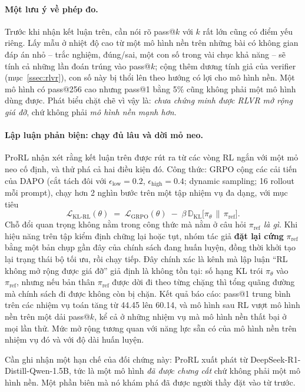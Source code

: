 \paragraph{Một lưu ý về phép đo.}
Trước khi nhận kết luận trên, cần nói rõ pass@$k$ với $k$ rất lớn cũng có điểm yếu riêng. Lấy mẫu ở nhiệt độ cao từ một mô hình nền trên những bài có không gian đáp án nhỏ -- trắc nghiệm, đúng/sai, một con số trong vài chục khả năng -- sẽ tính cả những lần đoán trúng vào pass@$k$; cộng thêm dương tính giả của verifier (mục~\ref{ssec:rlvr}), con số này bị thổi lên theo hướng có lợi cho mô hình nền. Một mô hình có pass@256 cao nhưng pass@1 bằng 5\% cũng không phải một mô hình dùng được. Phát biểu chặt chẽ vì vậy là: \emph{chưa chứng minh được RLVR mở rộng giá đỡ}, chứ không phải \emph{mô hình nền mạnh hơn}.

\paragraph{Lập luận phản biện: chạy đủ lâu và dời mỏ neo.}
ProRL \cite{liu2025prorl} nhận xét rằng kết luận trên được rút ra từ các vòng RL ngắn với một mỏ neo cố định, và thử phá cả hai điều kiện đó. Công thức: GRPO cộng các cải tiến của DAPO (cắt tách đôi với $\epsilon_{\mathrm{low}} = 0.2$, $\epsilon_{\mathrm{high}} = 0.4$; dynamic sampling; 16 rollout mỗi prompt), chạy hơn 2 nghìn bước trên một tập nhiệm vụ đa dạng, với mục tiêu
\[
\mathcal{L}_{\text{KL-RL}}(\theta) \;=\; \mathcal{L}_{\mathrm{GRPO}}(\theta) \;-\; \beta\,\mathbb{D}_{\mathrm{KL}}\big[\pi_\theta\,\big\|\,\pi_{\mathrm{ref}}\big].
\]
Chỗ đổi quan trọng không nằm trong công thức mà nằm ở câu hỏi \emph{$\pi_{\mathrm{ref}}$ là gì}. Khi hiệu năng trên tập kiểm định chững lại hoặc tụt, nhóm tác giả \textbf{đặt lại cứng} $\pi_{\mathrm{ref}}$ bằng một bản chụp gần đây của chính sách đang huấn luyện, đồng thời khởi tạo lại trạng thái bộ tối ưu, rồi chạy tiếp. Đây chính xác là kênh mà lập luận ``RL không mở rộng được giá đỡ'' giả định là không tồn tại: số hạng KL trói $\pi_\theta$ vào $\pi_{\mathrm{ref}}$, nhưng nếu bản thân $\pi_{\mathrm{ref}}$ được dời đi theo từng chặng thì tổng quãng đường mà chính sách đi được không còn bị chặn. Kết quả báo cáo: pass@1 trung bình trên các nhiệm vụ toán tăng từ 44.45 lên 60.14, và mô hình sau RL vượt mô hình nền trên một dải pass@$k$, kể cả ở những nhiệm vụ mà mô hình nền thất bại ở mọi lần thử. Mức mở rộng tương quan với năng lực sẵn có của mô hình nền trên nhiệm vụ đó và với độ dài huấn luyện.

Cần ghi nhận một hạn chế của đối chứng này: ProRL xuất phát từ DeepSeek-R1-Distill-Qwen-1.5B, tức là một mô hình \emph{đã được chưng cất} chứ không phải một mô hình nền. Một phần biên mà nó khám phá đã được người thầy đặt vào từ trước.

